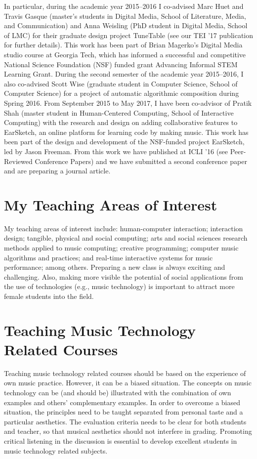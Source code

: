 \documentclass[10pt, a4paper]{article}
\begin{document}
In particular, during the academic year 2015--2016 I co-advised Marc Huet and Travis Gasque (master's students in Digital Media, School of Literature, Media, and Communication) and Anna Weisling (PhD student in Digital Media, School of LMC) for their graduate design project TuneTable (see our TEI '17 publication for further details). This work has been part of Brian Magerko’s Digital Media studio course at Georgia Tech, which has informed a successful and competitive National Science Foundation (NSF) funded grant Advancing Informal STEM Learning Grant. During the second semester of the academic year 2015--2016, I also co-advised Scott Wise (graduate student in Computer Science, School of Computer Science) for a project of automatic algorithmic composition during Spring 2016. From September 2015 to May 2017, I have been co-advisor of Pratik Shah (master student in Human-Centered Computing, School of Interactive Computing) with the research and design on adding collaborative features to EarSketch, an online platform for learning code by making music. This work has been part of the design and development of the NSF-funded project EarSketch, led by Jason Freeman. From this work we have published at ICLI '16 (see Peer-Reviewed Conference Papers) and we have submitted a second conference paper and are preparing a journal article.

\section*{My Teaching Areas of Interest}

My teaching areas of interest include: human-computer interaction; interaction design; tangible, physical and social computing; arts and social sciences research methods applied to music computing; creative programming; computer music algorithms and practices; and real-time interactive systems for music performance; among others. Preparing a new class is always exciting and challenging. Also, making more visible the potential of social applications from the use of technologies (e.g., music technology) is important to attract more female students into the field.

\section*{Teaching Music Technology Related Courses}

Teaching music technology related courses should be based on the experience of own music practice. However, it can be a biased situation. The concepts on music technology can be (and should be) illustrated with the combination of own examples and others' complementary examples. In order to overcome a biased situation, the principles need to be taught separated from  personal taste and a particular aesthetics. The evaluation criteria needs to be clear for both students and teacher, so that musical aesthetics should not interfere in grading. Promoting critical listening in the discussion is essential to develop excellent students in music technology related subjects. 
\end{document}
